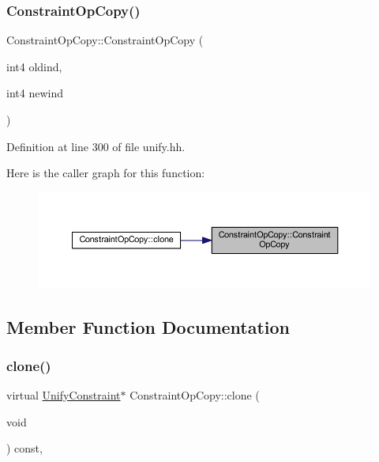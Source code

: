 \subsubsection{\texorpdfstring{ConstraintOpCopy()}{ConstraintOpCopy()}}
{\footnotesize\ttfamily Constraint\+Op\+Copy\+::\+Constraint\+Op\+Copy (\begin{DoxyParamCaption}\item[{int4}]{oldind,  }\item[{int4}]{newind }\end{DoxyParamCaption})\hspace{0.3cm}{\ttfamily [inline]}}



Definition at line 300 of file unify.\+hh.

Here is the caller graph for this function\+:
\nopagebreak
\begin{figure}[H]
\begin{center}
\leavevmode
\includegraphics[width=350pt]{class_constraint_op_copy_a6b4f2b1ce01261b51a7b3fdda02be126_icgraph}
\end{center}
\end{figure}


\subsection{Member Function Documentation}
\mbox{\label{class_constraint_op_copy_a849dd1a8ef637ec99dc9d067ccb1eca9}} 
\subsubsection{\texorpdfstring{clone()}{clone()}}
{\footnotesize\ttfamily virtual \mbox{\hyperlink{class_unify_constraint}{Unify\+Constraint}}$\ast$ Constraint\+Op\+Copy\+::clone (\begin{DoxyParamCaption}\item[{void}]{ }\end{DoxyParamCaption}) const\hspace{0.3cm}{\ttfamily [inline]}, {\ttfamily [virtual]}}



